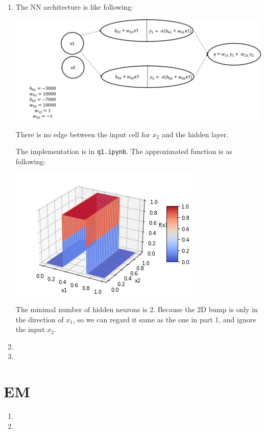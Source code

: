 \documentclass[paper=letter, fontsize=12pt]{article}
\begin{document}
\subsection{}

\begin{enumerate}[label=(\alph*)]
	\item The NN architecture is like following:
	
	\includegraphics[scale=0.4]{q12a1.png}
	
	There is no edge between the input cell for $x_2$ and the hidden layer.
	
	The implementation is in \verb|q1.ipynb|. The approximated function is as following:
	
	\includegraphics[scale=0.6]{q12a2.png}
	
	The minimal number of hidden neurons is 2.  Because the 2D bump is only in the direction of $x_1$, so we can regard it same as the one in part 1, and ignore the input $x_2$.
	\item 
	
	\item 
\end{enumerate}

\section{EM}
\begin{enumerate}[label=(\alph*)]
	\item 
	
	\item 
\end{enumerate}
\end{document}
